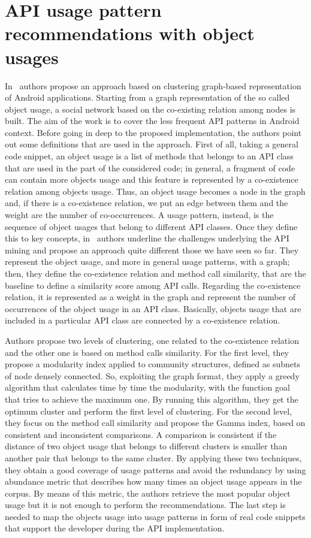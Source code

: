 \section{API usage pattern recommendations with object usages}
In~\cite{niu_api_2017} authors propose an approach based on clustering 
graph-based representation of Android applications. Starting from a graph 
representation of the so called object usage, a social network based on the 
co-existing relation among nodes is built. The aim of the work is to cover the 
less frequent API patterns in Android context. Before going in deep to the 
proposed implementation, the authors point out some definitions that are used 
in the approach. First of all, taking a general code snippet, an object usage 
is a list of methods that belongs to an API class that are used in the part of 
the considered code; in general, a fragment of code can contain more objects 
usage and this feature is represented by a co-existence relation among objects 
usage. Thus, an object usage becomes a node in the graph and, if there is a 
co-existence relation, we put an edge between them and the weight are the 
number of co-occurrences. A usage pattern, instead, is the sequence of object 
usages that belong to different API classes. Once they define this to key 
concepts, in~\cite{niu_api_2017} authors underline the challenges underlying 
the API mining and propose an approach quite different those we have seen so 
far. They represent the object usage, and more in general usage patterns, with 
a graph; then, they define the co-existence relation and method call 
similarity, that are the baseline to define a similarity score among API calls. 
Regarding the co-existence relation, it is represented as a weight in the graph 
and represent the number of occurrences of the object usage in an API class. 
Basically, objects usage that are included in a particular API class are 
connected by a co-existence relation. 

Authors propose two levels of clustering, one related to the co-existence 
relation and the other one is based on method calls similarity. For the first 
level, they propose a modularity index applied to community structures, defined 
as subnets of node densely connected. So, exploiting the graph format, they 
apply a greedy algorithm that calculates time by time the modularity, with the 
function goal that tries to achieve the maximum one. By running this algorithm, 
they get the optimum cluster and perform the first level of clustering. For the 
second level, they focus on the method call similarity and propose the Gamma 
index, based on consistent and inconsistent comparisons. A comparison is 
consistent if the distance of two object usage that belongs to different 
clusters is smaller than another pair that belongs to the same cluster. By 
applying these two techniques, they obtain a good coverage of usage patterns 
and avoid the redundancy by using abundance metric that describes how many 
times an object usage appears in the corpus. By means of this metric, the 
authors retrieve the most popular object usage but it is not enough to perform 
the recommendations. The last step is needed to map the objects usage into 
usage patterns in form of real code snippets that support the developer during 
the API implementation. 

